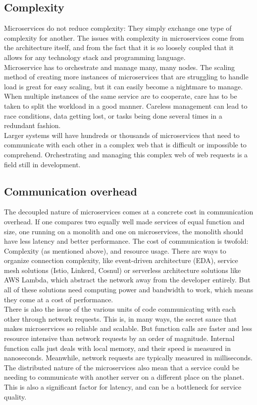 \subsection{Complexity}
Microservices do not reduce complexity: They simply exchange one type of complexity for another. 
The issues with complexity in microservices come from the architecture itself, and from the fact that it is so loosely coupled that it allows for any technology stack and programming language.\\
Microservice has to orchestrate and manage many, many nodes. 
The scaling method of creating more instances of microservices that are struggling to handle load is great for easy scaling, but it can easily become a nightmare to manage.
When multiple instances of the same service are to cooperate, care has to be taken to split the workload in a good manner.
Careless management can lead to race conditions, data getting lost, or tasks being done several times in a redundant fashion.\\
Larger systems will have hundreds or thousands of microservices that need to communicate with each other in a complex web that is difficult or impossible to comprehend.
Orchestrating and managing this complex web of web requests is a field still in development.

\subsection{Communication overhead}
The decoupled nature of microservices comes at a concrete cost in communication overhead.
If one compares two equally well made services of equal function and size, one running on a monolith and one on microservices, the monolith should have less latency and better performance.
The cost of communication is twofold: Complexity (as mentioned above), and resource usage.
There are ways to organize connection complexity, like event-driven architecture (EDA), service mesh solutions (Istio, Linkerd, Cosnul) or serverless architecture solutions like AWS Lambda, which abstract the network away from the developer entirely.
But all of these solutions need computing power and bandwidth to work, which means they come at a cost of performance. \\
There is also the issue of the various units of code communicating with each other through network requests.
This is, in many ways, the secret sauce that makes microservices so reliable and scalable. 
But function calls are faster and less resource intensive than network requests by an order of magnitude. 
Internal function calls just deals with local memory, and their speed is measured in nanoseconds.
Meanwhile, network requests are typically measured in milliseconds. 
The distributed nature of the microservices also mean that a service could be needing to communicate with another server on a different place on the planet.
This is also a significant factor for latency, and can be a bottleneck for service quality.


